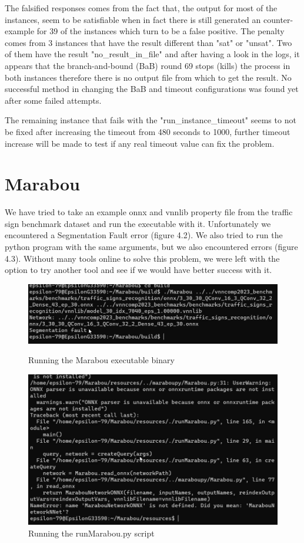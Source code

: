 \documentclass[12pt,a4paper]{report}
\newcommand\tab[1][5mm]{\hspace*{#1}}
\begin{document}
The falsified responses comes from the fact that, the output for most of the instances, seem to be satisfiable when in fact there is still generated an counter-example for 39 of the instances which turn to be a false positive. The penalty comes from 3 instances that have the result different than "sat" or "unsat". Two of them have the result "no\_result\_in\_file" and after having a look in the logs, it appears that the branch-and-bound (BaB) round 69 stops (kills) the process in both instances therefore there is no output file from which to get the result. No successful method in changing the BaB and timeout configurations was found yet after some failed attempts.

The remaining instance that fails with the "run\_instance\_timeout" seems to not be fixed after increasing the timeout from 480 seconds to 1000, further timeout increase will be made to test if any real timeout value can fix the problem.

\section{Marabou}
\tab We have tried to take an example onnx and vnnlib property file from the traffic sign benchmark dataset and run the executable with it. Unfortunately we encountered a Segmentation Fault error (figure 4.2). We also tried to run the python program with the same arguments, but we also encountered errors (figure 4.3). Without many tools online to solve this problem, we were left with the option to try another tool and see if we would have better success with it.
\begin{figure}[h]
\centering
\includegraphics[scale=0.6]{marabou_error1.png}
\caption{Running the Marabou executable binary}
\includegraphics[scale = 0.6]{marabou_error2.png}
\caption{Running the runMarabou.py script}
\end{figure}
\end{document}
